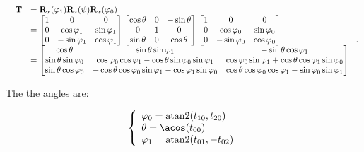     \begin{equation}
        \scalebox{0.85}{
            $ \begin{array}{ll}
                \mathbf{T}
                &= \mathbf{R}_{x}(\varphi_1)\mathbf{R}_{z}(\psi)\mathbf{R}_{x}(\varphi_0) \\
                &=
                \begin{bmatrix}
                    1 & 0 & 0 \\
                    0 & \cos \varphi_1 & \sin \varphi_1 \\
                    0 & -\sin \varphi_1 & \cos \varphi_1
                \end{bmatrix}
                \begin{bmatrix}
                    \cos \theta & 0 & -\sin \theta \\
                    0 & 1 & 0 \\
                    \sin \theta & 0 & \cos \theta
                \end{bmatrix}
                \begin{bmatrix}
                    1 & 0 & 0 \\
                    0 & \cos \varphi_0 & \sin \varphi_0 \\
                    0 & -\sin \varphi_0 & \cos \varphi_0
                \end{bmatrix} \\
                &=
                \begin{bmatrix}
                    \cos \theta
                    &  \sin \theta \sin \varphi_1
                    & -\sin \theta \cos \varphi_1 \\
                    \sin \theta \sin \varphi_0
                    & \cos \varphi_0 \cos \varphi_1 - \cos \theta \sin \varphi_0 \sin \varphi_1
                    & \cos \varphi_0 \sin \varphi_1 + \cos \theta \cos \varphi_1 \sin \varphi_0 \\
                    \sin \theta \cos \varphi_0
                    & -\cos \theta \cos \varphi_0 \sin \varphi_1 - \cos \varphi_1 \sin \varphi_0
                    & \cos \theta \cos \varphi_0 \cos \varphi_1 - \sin \varphi_0 \sin \varphi_1
                \end{bmatrix}
            \end{array} $
        }
    .\end{equation}

    The the angles are:

    \begin{equation}
        \left\{ \begin{array}{l}
            \varphi_0 = \atantwo(t_{10}, t_{20}) \\
            \theta = \acos(t_{00}) \\
            \varphi_1 = \atantwo(t_{01}, -t_{02})
        \end{array} \right.
    \end{equation}

